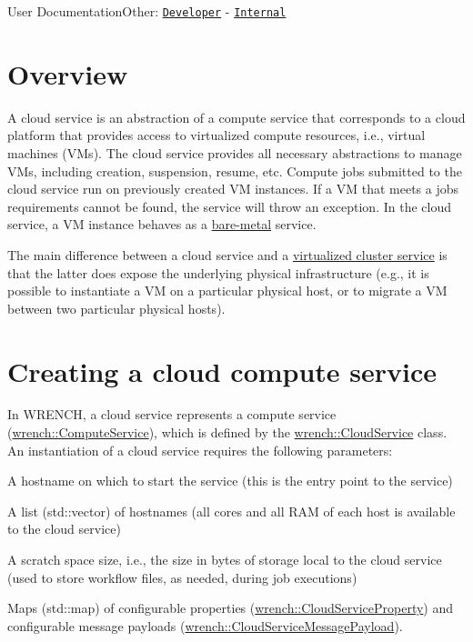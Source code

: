 User DocumentationOther\+: \href{../developer/guide-cloud.html}{\tt Developer} -\/ \href{../internal/guide-cloud.html}{\tt Internal}\hypertarget{guide-cloud_guide-cloud-overview}{}\section{Overview}\label{guide-cloud_guide-cloud-overview}
A cloud service is an abstraction of a compute service that corresponds to a cloud platform that provides access to virtualized compute resources, i.\+e., virtual machines (V\+Ms). The cloud service provides all necessary abstractions to manage V\+Ms, including creation, suspension, resume, etc. Compute jobs submitted to the cloud service run on previously created VM instances. If a VM that meets a job\textquotesingle{}s requirements cannot be found, the service will throw an exception. In the cloud service, a VM instance behaves as a \hyperlink{guide-baremetal}{bare-\/metal} service.

The main difference between a cloud service and a \hyperlink{guide-virtualizedcluster}{virtualized cluster service} is that the latter does expose the underlying physical infrastructure (e.\+g., it is possible to instantiate a VM on a particular physical host, or to migrate a VM between two particular physical hosts).\hypertarget{guide-cloud_guide-cloud-creating}{}\section{Creating a cloud compute service}\label{guide-cloud_guide-cloud-creating}
In W\+R\+E\+N\+CH, a cloud service represents a compute service (\hyperlink{classwrench_1_1_compute_service}{wrench\+::\+Compute\+Service}), which is defined by the \hyperlink{classwrench_1_1_cloud_service}{wrench\+::\+Cloud\+Service} class. An instantiation of a cloud service requires the following parameters\+:


\begin{DoxyItemize}
\item A hostname on which to start the service (this is the entry point to the service)
\item A list ({\ttfamily std\+::vector}) of hostnames (all cores and all R\+AM of each host is available to the cloud service)
\item A scratch space size, i.\+e., the size in bytes of storage local to the cloud service (used to store workflow files, as needed, during job executions)
\item Maps ({\ttfamily std\+::map}) of configurable properties ({\ttfamily \hyperlink{classwrench_1_1_cloud_service_property}{wrench\+::\+Cloud\+Service\+Property}}) and configurable message payloads ({\ttfamily \hyperlink{classwrench_1_1_cloud_service_message_payload}{wrench\+::\+Cloud\+Service\+Message\+Payload}}).
\end{DoxyItemize}

